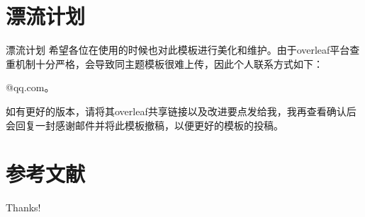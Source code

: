 \documentclass{CAUBeamer}
\begin{document}
\section{漂流计划}
\begin{frame}{漂流计划}
    希望各位在使用的时候也对此模板进行美化和维护。由于overleaf平台查重机制十分严格，会导致同主题模板很难上传，因此个人联系方式如下：
    \par {}@qq.com。
    \par 如有更好的版本，请将其overleaf共享链接以及改进要点发给我，我再查看确认后会回复一封感谢邮件并将此模板撤稿，以便更好的模板的投稿。
\end{frame}

\section{参考文献}

\begin{frame}[allowframebreaks]
    
    
\end{frame}

\begin{frame}
    \begin{center}
        {\Huge\calligra Thanks!}
    \end{center}
\end{frame}
\end{document}
